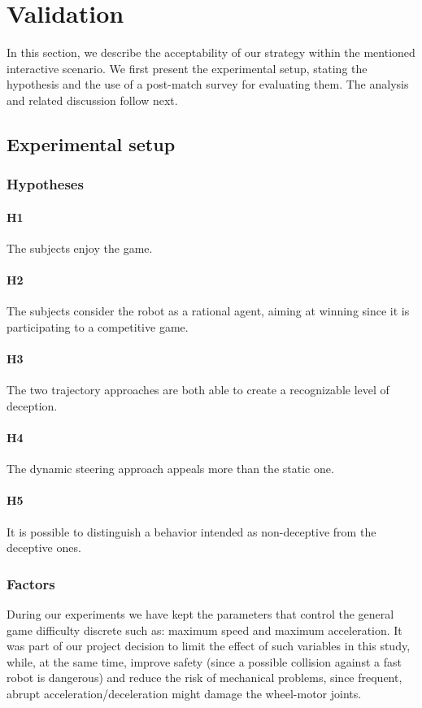 \section{Validation}
\label{sec:deception_validation}
In this section, we describe the acceptability of our strategy within the mentioned interactive scenario. We first present the experimental setup, stating the hypothesis and the use of a post-match survey for evaluating them. The analysis and related discussion follow next. 


\subsection{Experimental setup}
\subsubsection{Hypotheses}

\paragraph{H1} The subjects enjoy the game.
\paragraph{H2} The subjects consider the robot as a rational agent, aiming at winning since it is participating to a competitive game.
\paragraph{H3} The two trajectory approaches are both able to create a recognizable level of deception. 
\paragraph{H4} The dynamic steering approach appeals more than the static one.
\paragraph{H5} It is possible to distinguish a behavior intended as non-deceptive from the deceptive ones.

\subsubsection{Factors}
During our experiments we have kept the parameters that control the general game difficulty discrete such as: maximum speed and maximum acceleration. It was part of our project decision to limit the effect of such variables in this study, while, at the same time, improve safety (since a possible collision against a fast robot is dangerous) and reduce the risk of mechanical problems, since frequent, abrupt acceleration/deceleration might damage the wheel-motor joints.


